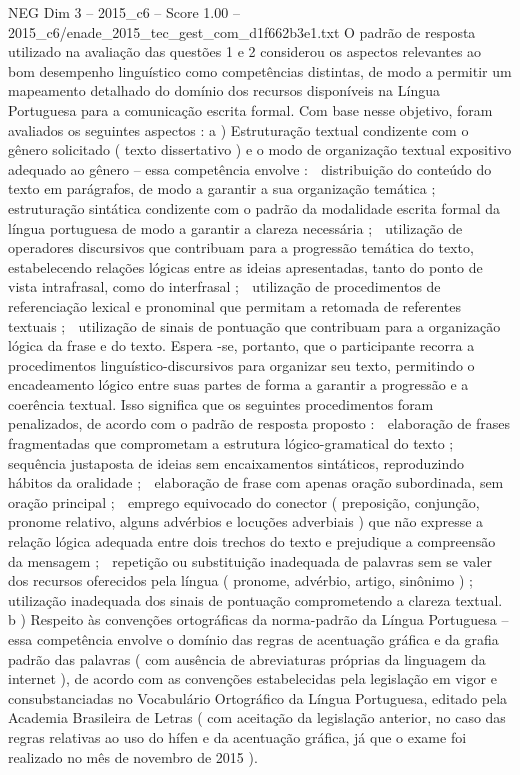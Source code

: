 \begin{textsample}{NEG Dim 3 – 2015\_c6 – Score 1.00 – 2015\_c6/enade\_2015\_tec\_gest\_com\_d1f662b3e1.txt}
O padrão de resposta utilizado na avaliação das questões 1 e 2 considerou os aspectos relevantes ao bom desempenho linguístico como competências distintas, de modo a permitir um mapeamento detalhado do domínio dos recursos disponíveis na Língua Portuguesa para a comunicação escrita formal.
Com base nesse objetivo, foram avaliados os seguintes aspectos : a ) Estruturação textual condizente com o gênero solicitado ( texto dissertativo ) e o modo de organização textual expositivo adequado ao gênero – essa competência envolve :  distribuição do conteúdo do texto em parágrafos, de modo a garantir a sua organização temática ;  estruturação sintática condizente com o padrão da modalidade escrita formal da língua portuguesa de modo a garantir a clareza necessária ;  utilização de operadores discursivos que contribuam para a progressão temática do texto, estabelecendo relações lógicas entre as ideias apresentadas, tanto do ponto de vista intrafrasal, como do interfrasal ;  utilização de procedimentos de referenciação lexical e pronominal que permitam a retomada de referentes textuais ;  utilização de sinais de pontuação que contribuam para a organização lógica da frase e do texto.
Espera -se, portanto, que o participante recorra a procedimentos linguístico-discursivos para organizar seu texto, permitindo o encadeamento lógico entre suas partes de forma a garantir a progressão e a coerência textual.
Isso significa que os seguintes procedimentos foram penalizados, de acordo com o padrão de resposta proposto :  elaboração de frases fragmentadas que comprometam a estrutura lógico-gramatical do texto ;  sequência justaposta de ideias sem encaixamentos sintáticos, reproduzindo hábitos da oralidade ;  elaboração de frase com apenas oração subordinada, sem oração principal ;  emprego equivocado do conector ( preposição, conjunção, pronome relativo, alguns advérbios e locuções adverbiais ) que não expresse a relação lógica adequada entre dois trechos do texto e prejudique a compreensão da mensagem ;  repetição ou substituição inadequada de palavras sem se valer dos recursos oferecidos pela língua ( pronome, advérbio, artigo, sinônimo ) ;  utilização inadequada dos sinais de pontuação comprometendo a clareza textual. b ) Respeito às convenções ortográficas da norma-padrão da Língua Portuguesa – essa competência envolve o domínio das regras de acentuação gráfica e da grafia padrão das palavras ( com ausência de abreviaturas próprias da linguagem da internet ), de acordo com as convenções estabelecidas pela legislação em vigor e consubstanciadas no Vocabulário Ortográfico da Língua Portuguesa, editado pela Academia Brasileira de Letras ( com aceitação da legislação anterior, no caso das regras relativas ao uso do hífen e da acentuação gráfica, já que o exame foi realizado no mês de novembro de 2015 ).

\end{textsample}
